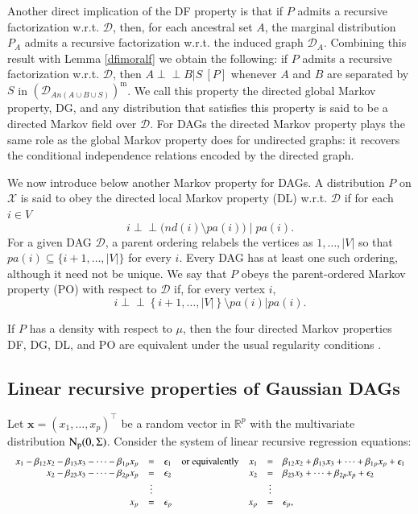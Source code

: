 \documentclass[12pt]{article}
\newcommand{\R}{\mathbb{R}}
\newcommand{\D}{\mathcal{D}}
\providecommand{\Perp}{}
\renewcommand{\Perp}{\perp\!\!\!\perp}
\theoremstyle{plain}
\theoremstyle{definition}
\theoremstyle{remark}
\begin{document}
\indent
Another direct implication of the DF property is that if  $P$  admits a recursive factorization w.r.t.  $\D$, then, for each ancestral set $A$, the marginal distribution   $P_A$   admits a recursive factorization w.r.t.  the induced graph  $\D_A$. Combining this result with Lemma \ref{dfimoralf} we obtain the following: if \(P\) admits a recursive factorization w.r.t. \(\D\), then $A\Perp B| S\  [P]$ whenever  $A$  and  $B$ are separated by  $S$  in  $(\D_{An(A\cup B\cup S)})^{\mathrm{m}}$. We call this property the directed global Markov property, DG, and any distribution that satisfies this property is said to be a directed Markov field over $\D$. For DAGs the directed Markov property plays the same role as the global Markov property does for undirected graphs: it recovers the conditional independence relations encoded by the directed graph.

\indent We now introduce below another Markov property for DAGs. A  distribution   $P$  on  $\mathcal{X}$ is said to obey the {directed local Markov property} (DL) w.r.t. $\D$  if  for each  $i\in V$
  \[
  i\Perp \bigl(nd(i)\setminus pa(i)\bigr)\mid pa(i).
  \]
  For a given DAG \(\D\), a parent ordering relabels the vertices as
  \(1,\ldots,|V|\) so that
  \(pa(i)\subseteq\{i+1,\ldots,|V|\}\) for every \(i\).  Every DAG has
  at least one such ordering, although it need not be unique.  We say
  that \(P\) obeys the parent-ordered Markov property (PO) with respect
  to \(\D\) if, for every vertex \(i\),
 \[
  i\Perp \left\{i+1,\ldots, |V|\right\}\setminus pa(i)|pa(i).
  \]

\indent If \(P\) has a density with respect to \(\mu\), then the four
directed Markov properties DF, DG, DL, and PO are equivalent under the
usual regularity conditions \cite{lauritzen96*}.

\subsection*{Linear recursive properties of Gaussian DAGs}\label{subs: Lrp}
Let $\mathbf{x}=\left(x_1,\ldots,x_{p}\right)^{\top}$  be  a random vector in  $\R^{p}$  with    the multivariate distribution  $\rm{N}_{p}(0, \Sigma)$.  Consider the system of linear recursive regression equations:
\[
\scalebox{.85}{$\displaystyle
\begin{array}{rclcrcl}
x_1-\beta_{12}x_2-\beta_{13}x_3-\cdots-\beta_{1p}x_{p}&=&\epsilon_1 
&\text {or equivalently} &
x_1&=&\beta_{12}x_2+\beta_{13}x_3+\cdots+\beta_{1p}x_{p}+\epsilon_1\\
x_2-\beta_{23}x_3-\cdots-\beta_{2p}x_{p}&=&\epsilon_2
&\quad&
x_2&=&\beta_{23}x_3+\cdots+\beta_{2p}x_{p}+\epsilon_2\\
&\vdots& &&&\vdots& \\
x_{p}&=&\epsilon_{p}
&\quad&
x_{p}&=&\epsilon_{p},
\end{array}$}
\]
\end{document}
